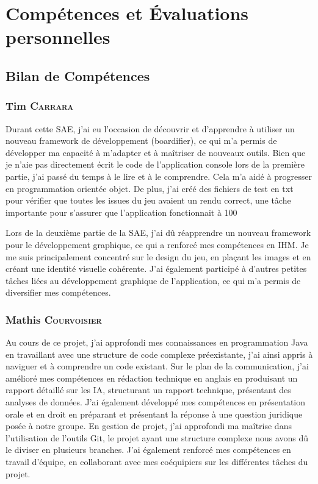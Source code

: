 \appendix

\chapter{Compétences et Évaluations personnelles}

\setcounter{page}{1}
\renewcommand{\thepage}{\Roman{page}}


\section{Bilan de Compétences}

\subsection*{Tim \textsc{Carrara}}

Durant cette SAE, j'ai eu l'occasion de découvrir et d'apprendre à utiliser un nouveau framework de développement (boardifier), ce qui m'a permis de développer ma capacité à m'adapter et à maîtriser de nouveaux outils. Bien que je n'aie pas directement écrit le code de l'application console lors de la première partie, j'ai passé du temps à le lire et à le comprendre. Cela m'a aidé à progresser en programmation orientée objet. De plus, j'ai créé des fichiers de test en txt pour vérifier que toutes les issues du jeu avaient un rendu correct, une tâche importante pour s'assurer que l'application fonctionnait à 100%

Lors de la deuxième partie de la SAE, j'ai dû réapprendre un nouveau framework pour le développement graphique, ce qui a renforcé mes compétences en IHM. Je me suis principalement concentré sur le design du jeu, en plaçant les images et en créant une identité visuelle cohérente. J'ai également participé à d'autres petites tâches liées au développement graphique de l'application, ce qui m'a permis de diversifier mes compétences.

\subsection*{Mathis \textsc{Courvoisier}}

Au cours de ce projet, j'ai approfondi mes connaissances en programmation Java en travaillant avec une structure de code complexe préexistante, j'ai ainsi appris à naviguer et à comprendre un code existant. Sur le plan de la communication, j'ai amélioré mes compétences en rédaction technique en anglais en produisant un rapport détaillé sur les IA, structurant un rapport technique, présentant des analyses de données. J'ai également développé mes compétences en présentation orale et en droit en préparant et présentant la réponse à une question juridique posée à notre groupe. En gestion de projet, j'ai approfondi ma maîtrise dans l’utilisation de l’outils Git, le projet ayant une structure complexe nous avons dû le diviser en plusieurs branches. J'ai également renforcé mes compétences en travail d'équipe, en collaborant avec mes coéquipiers sur les différentes tâches du projet.

